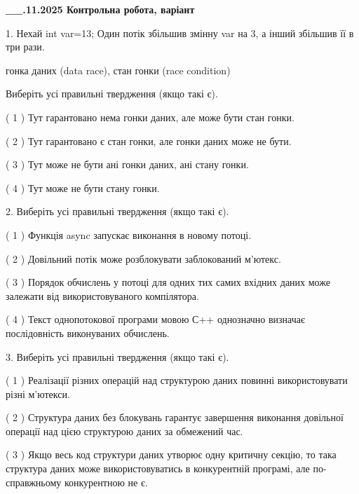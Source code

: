 \documentclass[12pt, ukrainian]{article}
\begin{document}
\newpage
\begin {large}

\textbf{\_\_.11.2025 Контрольна робота, варіант  }\par


{
1. Нехай int var=13; Один потік збільшив змінну var на 3, а інший збільшив її в три рази.

гонка даних (data race), стан гонки (race condition)

Виберіть усі правильні твердження (якщо такі є).\par
\vspace{2mm}
( 1 ) Тут гарантовано нема гонки даних, але може бути стан гонки.%

( 2 ) Тут гарантовано є стан гонки, але гонки даних може не бути.%

( 3 ) Тут може не бути ані гонки даних, ані стану гонки.%

( 4 ) Тут може не бути стану гонки.%


2. Виберіть усі правильні твердження (якщо такі є).\par
\vspace{2mm}

( 1 ) Функція async запускає виконання в новому потоці.%

( 2 ) Довільний потік може розблокувати заблокований м’ютекс.%

( 3 ) Порядок обчислень у потоці для одних тих самих вхідних даних може залежати від використовуваного компілятора.%

( 4 ) Текст однопотокової програми мовою С++ однозначно визначає послідовність виконуваних обчислень.%


3. Виберіть усі правильні твердження (якщо такі є).\par
\vspace{2mm}

( 1 ) Реалізації різних операцій над структурою даних повинні використовувати різні м’ютекси.%

( 2 ) Структура даних без блокувань гарантує завершення виконання довільної операції над цією структурою даних за обмежений час.%

( 3 ) Якщо весь код структури даних утворює одну критичну секцію, то така структура даних може використовуватись в конкурентній програмі, але по-справжньо\-му конкурентною не є.%

}
\end{large}
\end{document}
